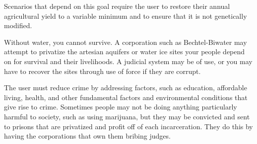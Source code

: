Scenarios that depend on this goal require the user to restore their annual agricultural yield to a variable minimum and to ensure that it is not genetically modified.


Without water, you cannot survive. A corporation such as Bechtel-Biwater may attempt to privatize the artesian aquifers or water ice sites your people depend on for survival and their livelihoods. A judicial system may be of use, or you may have to recover the sites through use of force if they are corrupt.


The user must reduce crime by addressing factors, such as education, affordable living, health, and other fundamental factors and environmental conditions that give rise to crime. Sometimes people may not be doing anything particularly harmful to society, such as using marijuana, but they may be convicted and sent to prisons that are privatized and profit off of each incarceration. They do this by having the corporations that own them bribing judges.

\stopitemize

